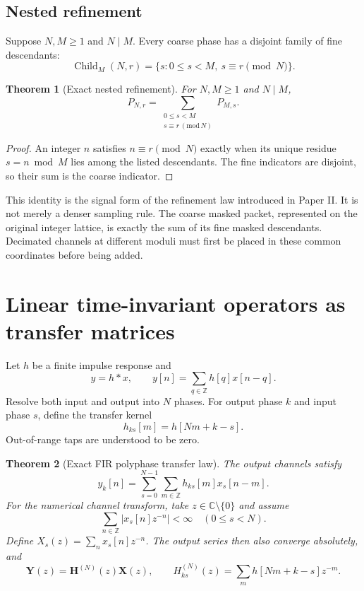 \documentclass[11pt]{article}
\newtheorem{theorem}{Theorem}[section]
\theoremstyle{definition}
\theoremstyle{remark}
\newcommand{\bbC}{\mathbb C}
\newcommand{\bbZ}{\mathbb Z}
\begin{document}
\subsection{Nested refinement}

Suppose $N,M\ge1$ and $N\mid M$. Every coarse phase has a disjoint family of fine descendants:
\[
\operatorname{Child}_{M}(N,r)
=
\{s:0\le s<M,\ s\equiv r\pmod N\}.
\]

\begin{theorem}[Exact nested refinement]\label{result:04}
For $N,M\ge1$ and $N\mid M$,
\[
\boxed{
P_{N,r}
=
\sum_{\substack{0\le s<M\\s\equiv r\, (\mathrm{mod}\,N)}}P_{M,s}.
}
\]
\end{theorem}

\begin{proof}
An integer $n$ satisfies $n\equiv r\pmod N$ exactly when its unique residue $s=n\bmod M$ lies among the listed descendants. The fine indicators are disjoint, so their sum is the coarse indicator.
\end{proof}

This identity is the signal form of the refinement law introduced in Paper II. It is not merely a denser sampling rule. The coarse masked packet, represented on the original integer lattice, is exactly the sum of its fine masked descendants. Decimated channels at different moduli must first be placed in these common coordinates before being added.

\section{Linear time-invariant operators as transfer matrices}

Let $h$ be a finite impulse response and
\[
y=h*x,
\qquad
y[n]=\sum_{q\in\bbZ}h[q]x[n-q].
\]
Resolve both input and output into $N$ phases. For output phase $k$ and input phase $s$, define the transfer kernel
\[
\boxed{
h_{ks}[m]=h[Nm+k-s].
}
\]
Out-of-range taps are understood to be zero.

\begin{theorem}[Exact FIR polyphase transfer law]\label{result:05}
The output channels satisfy
\[
\boxed{
y_k[n]
=
\sum_{s=0}^{N-1}\sum_{m\in\bbZ}
h_{ks}[m]x_s[n-m].
}
\]
For the numerical channel transform, take $z\in\bbC\setminus\{0\}$ and assume
\[
\sum_{n\in\bbZ}|x_s[n]z^{-n}|<\infty\quad(0\le s<N).
\]
Define $X_s(z)=\sum_nx_s[n]z^{-n}$. The output series then also converge absolutely, and
\[
\bm Y(z)=\bm H^{(N)}(z)\bm X(z),
\qquad
H^{(N)}_{ks}(z)=\sum_m h[Nm+k-s]z^{-m}.
\]
\end{theorem}
\end{document}
